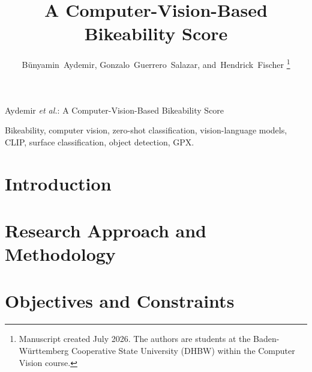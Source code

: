 \documentclass[letterpaper,journal]{IEEEtran}
\begin{document}
\title{A Computer-Vision-Based Bikeability Score}

\author{Bünyamin~Aydemir,
        Gonzalo~Guerrero~Salazar,
        and~Hendrick~Fischer%
\thanks{Manuscript created July 2026. The authors are students at the
Baden-Württemberg Cooperative State University (DHBW) within the
Computer Vision course.}}

%
{Aydemir \MakeLowercase{\textit{et al.}}: A Computer-Vision-Based Bikeability Score}

\maketitle

\begin{abstract}
\end{abstract}

\begin{IEEEkeywords}
Bikeability, computer vision, zero-shot classification, vision-language models,
CLIP, surface classification, object detection, GPX.
\end{IEEEkeywords}


\section{Introduction}

\section{Research Approach and Methodology}

\section{Objectives and Constraints}

\end{document}
